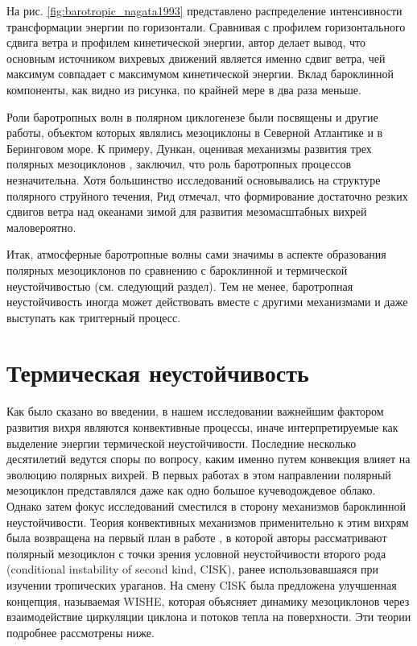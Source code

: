 На рис. \ref{fig:barotropic_nagata1993} представлено распределение интенсивности трансформации энергии по горизонтали. Сравнивая с профилем горизонтального сдвига ветра и профилем кинетической энергии, автор делает вывод, что основным источником вихревых движений является именно сдвиг ветра, чей максимум совпадает с максимумом кинетической энергии. Вклад бароклинной компоненты, как видно из рисунка, по крайней мере в два раза меньше.

Роли баротропных волн в полярном циклогенезе были посвящены и другие работы, объектом которых являлись мезоциклоны в Северной Атлантике и в Беринговом море. К примеру, Дункан, оценивая механизмы развития трех полярных мезоциклонов \citep{RT2003}, заключил, что роль баротропных процессов незначительна. Хотя большинство исследований основывались на структуре полярного струйного течения, Рид \citep{ReedDuncan1987} отмечал, что формирование достаточно резких сдвигов ветра над океанами зимой для развития мезомасштабных вихрей маловероятно.

Итак, атмосферные баротропные волны сами значимы в аспекте образования полярных мезоциклонов по сравнению с бароклинной и термической неустойчивостью (см. следующий раздел). Тем не менее, баротропная неустойчивость иногда может действовать вместе с другими механизмами и даже выступать как триггерный процесс.

\section{Термическая неустойчивость}
Как было сказано во введении, в нашем исследовании важнейшим фактором развития вихря являются конвективные процессы, иначе интерпретируемые как выделение энергии термической неустойчивости. Последние несколько десятилетий ведутся споры по вопросу, каким именно путем конвекция влияет на эволюцию полярных вихрей. В первых работах в этом направлении полярный мезоциклон представлялся даже как одно большое кучеводождевое облако. Однако затем фокус исследований сместился в сторону механизмов бароклинной неустойчивости. Теория конвективных механизмов применительно к этим вихрям была возвращена на первый план в работе \citep{Okland1987,Rasmussen1979}, в которой авторы рассматривают полярный мезоциклон с точки зрения условной неустойчивости второго рода (conditional instability of second kind, CISK), ранее использовавшаяся при изучении тропических ураганов. На смену CISK была предложена улучшенная концепция, называемая WISHE, которая объясняет динамику мезоциклонов через взаимодействие циркуляции циклона и потоков тепла на поверхности. Эти теории подробнее рассмотрены ниже.

